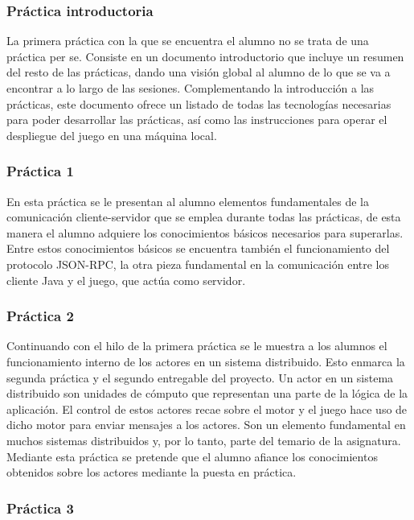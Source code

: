 \subsubsection{Práctica introductoria}

La primera práctica con la que se encuentra el alumno no se trata de una práctica per se. Consiste en un documento introductorio que incluye un resumen del resto de las prácticas, dando una visión global al alumno de lo que se va a encontrar a lo largo de las sesiones. Complementando la introducción a las prácticas, este documento ofrece un listado de todas las tecnologías necesarias para poder desarrollar las prácticas, así como las instrucciones para operar el despliegue del juego en una máquina local.

\subsubsection{Práctica 1}

En esta práctica se le presentan al alumno elementos fundamentales de la comunicación cliente-servidor que se emplea durante todas las prácticas, de esta manera el alumno adquiere los conocimientos básicos necesarios para superarlas. Entre estos conocimientos básicos se encuentra también el funcionamiento del protocolo JSON-RPC, la otra pieza fundamental en la comunicación entre los cliente Java y el juego, que actúa como servidor.

\subsubsection{Práctica 2}

Continuando con el hilo de la primera práctica se le muestra a los alumnos el funcionamiento interno de los actores en un sistema distribuido. Esto enmarca la segunda práctica y el segundo entregable del proyecto. Un actor en un sistema distribuido son unidades de cómputo que representan una parte de la lógica de la aplicación. El control de estos actores recae sobre el motor y el juego hace uso de dicho motor para enviar mensajes a los actores. Son un elemento fundamental en muchos sistemas distribuidos y, por lo tanto, parte del temario de la asignatura. Mediante esta práctica se pretende que el alumno afiance los conocimientos obtenidos sobre los actores mediante la puesta en práctica.

\subsubsection{Práctica 3}

